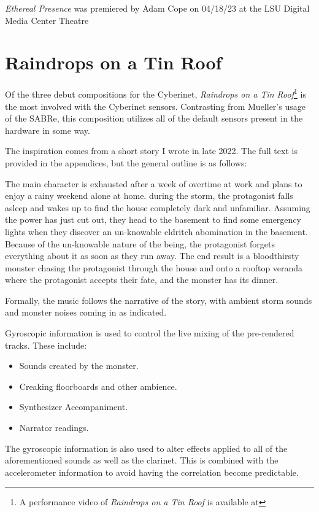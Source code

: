 \textit{Ethereal Presence} was premiered by Adam Cope on 04/18/23 at the LSU Digital Media Center Theatre

\section{Raindrops on a Tin Roof}
Of the three debut compositions for the Cyberinet, \textit{Raindrops on a Tin Roof}\footnote{A performance video of \textit{Raindrops on a Tin Roof} is available at} is the most involved with the Cyberinet sensors. Contrasting from Mueller's usage of the SABRe, this composition utilizes all of the default sensors present in the hardware in some way. 

The inspiration comes from a short story I wrote in late 2022. The full text is provided in the appendices, but the general outline is as follows:

The main character is exhausted after a week of overtime at work and plans to enjoy a rainy weekend alone at home. during the storm, the protagonist falls asleep and wakes up to find the house completely dark and unfamiliar. Assuming the power has just cut out, they head to the basement to find some emergency lights when they discover an un-knowable eldritch abomination in the basement. Because of the un-knowable nature of the being, the protagonist forgets everything about it as soon as they run away. The end result is a bloodthirsty monster chasing the protagonist through the house and onto a rooftop veranda where the protagonist accepts their fate, and the monster has its dinner.

Formally, the music follows the narrative of the story, with ambient storm sounds and monster noises coming in as indicated. 

Gyroscopic information is used to control the live mixing of the pre-rendered tracks. These include:
\begin{itemize}
    \item Sounds created by the monster.
    \item Creaking floorboards and other ambience.
    \item Synthesizer Accompaniment.
    \item Narrator readings.
\end{itemize}

The gyroscopic information is also used to alter effects applied to all of the aforementioned sounds as well as the clarinet. This is combined with the accelerometer information to avoid having the correlation become predictable.

